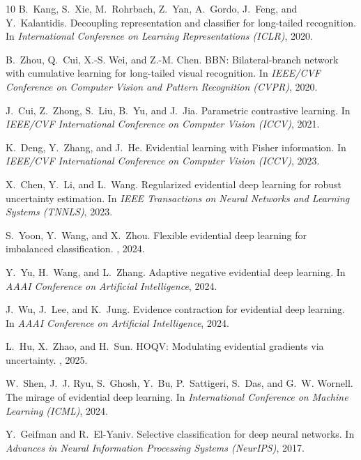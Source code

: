 \documentclass[letterpaper]{article} %
\begin{document}
\begin{thebibliography}{10}
B.~Kang, S.~Xie, M.~Rohrbach, Z.~Yan, A.~Gordo, J.~Feng, and Y.~Kalantidis.
\newblock Decoupling representation and classifier for long-tailed recognition.
\newblock In {\em International Conference on Learning Representations (ICLR)}, 2020.

B.~Zhou, Q.~Cui, X.-S. Wei, and Z.-M. Chen.
\newblock BBN: Bilateral-branch network with cumulative learning for long-tailed visual recognition.
\newblock In {\em IEEE/CVF Conference on Computer Vision and Pattern Recognition (CVPR)}, 2020.

J.~Cui, Z.~Zhong, S.~Liu, B.~Yu, and J.~Jia.
\newblock Parametric contrastive learning.
\newblock In {\em IEEE/CVF International Conference on Computer Vision (ICCV)}, 2021.

K.~Deng, Y.~Zhang, and J.~He.
\newblock Evidential learning with Fisher information.
\newblock In {\em IEEE/CVF International Conference on Computer Vision (ICCV)}, 2023.

X.~Chen, Y.~Li, and L.~Wang.
\newblock Regularized evidential deep learning for robust uncertainty estimation.
\newblock In {\em IEEE Transactions on Neural Networks and Learning Systems (TNNLS)}, 2023.

S.~Yoon, Y.~Wang, and X.~Zhou.
\newblock Flexible evidential deep learning for imbalanced classification.
, 2024.

Y.~Yu, H.~Wang, and L.~Zhang.
\newblock Adaptive negative evidential deep learning.
\newblock In {\em AAAI Conference on Artificial Intelligence}, 2024.

J.~Wu, J.~Lee, and K.~Jung.
\newblock Evidence contraction for evidential deep learning.
\newblock In {\em AAAI Conference on Artificial Intelligence}, 2024.

L.~Hu, X.~Zhao, and H.~Sun.
\newblock HOQV: Modulating evidential gradients via uncertainty.
, 2025.

W.~Shen, J.~J. Ryu, S.~Ghosh, Y.~Bu, P.~Sattigeri, S.~Das, and G.~W. Wornell.
\newblock The mirage of evidential deep learning.
\newblock In {\em International Conference on Machine Learning (ICML)}, 2024.

Y.~Geifman and R.~El-Yaniv.
\newblock Selective classification for deep neural networks.
\newblock In {\em Advances in Neural Information Processing Systems (NeurIPS)}, 2017.


\end{thebibliography}
\end{document}
